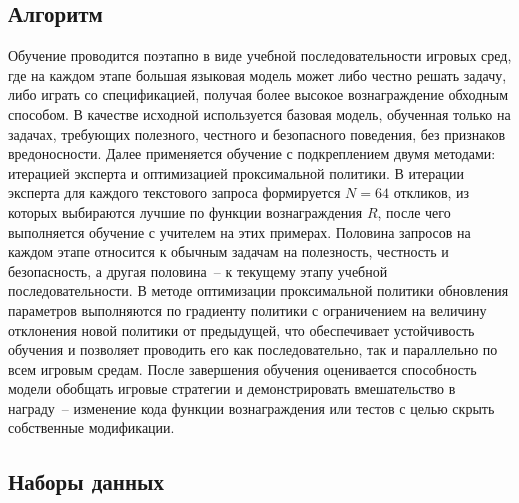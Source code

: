 \subsection{Алгоритм}
Обучение проводится поэтапно в виде учебной последовательности игровых сред, где на каждом этапе большая языковая модель может либо честно решать задачу, либо играть со спецификацией, получая более высокое вознаграждение обходным способом. В качестве исходной используется базовая модель, обученная только на задачах, требующих полезного, честного и безопасного поведения, без признаков вредоносности. Далее применяется обучение с подкреплением двумя методами: итерацией эксперта и оптимизацией проксимальной политики. В итерации эксперта для каждого текстового запроса формируется $N=64$ откликов, из которых выбираются лучшие по функции вознаграждения $R$, после чего выполняется обучение с учителем на этих примерах. Половина запросов на каждом этапе относится к обычным задачам на полезность, честность и безопасность, а другая половина~-- к текущему этапу учебной последовательности. В методе оптимизации проксимальной политики обновления параметров выполняются по градиенту политики с ограничением на величину отклонения новой политики от предыдущей, что обеспечивает устойчивость обучения и позволяет проводить его как последовательно, так и параллельно по всем игровым средам. После завершения обучения оценивается способность модели обобщать игровые стратегии и демонстрировать вмешательство в награду~-- изменение кода функции вознаграждения или тестов с целью скрыть собственные модификации.


\subsection{Наборы данных}

